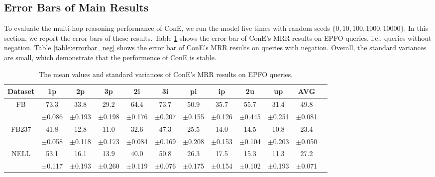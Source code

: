 \documentclass{article}
\newcommand{\std}[1]{\tiny{$\pm$#1}}
\begin{document}
\subsection{Error Bars of Main Results}
To evaluate the multi-hop reasoning performance of ConE, we run the model five times with random seeds $\{0,10,100,1000,10000\}$. In this section, we report the error bars of these results. Table \ref{table:errorbar_epfo} shows the error bar of ConE's MRR results on EPFO queries, i.e., queries without negation. Table \ref{table:errorbar_neg} shows the error bar of ConE's MRR results on queries with negation. Overall, the standard variances are small, which demonstrate that the performence of ConE is stable.

\begin{table}[!ht]
    \centering
    \caption{The mean values and standard variances of ConE's MRR results on EPFO queries.}
    \label{table:errorbar_epfo}
    \vspace{1mm}
    \begin{tabular}{c c c  c c c c  c c c c c}
        \toprule
          \textbf{Dataset} &\textbf{1p} &\textbf{2p} &\textbf{3p} &\textbf{2i} &\textbf{3i} &\textbf{pi} &\textbf{ip} &\textbf{2u} &\textbf{up} &\textbf{AVG} \\
        \midrule
        \multirow{2}{*}{FB} &73.3 &33.8 &29.2 &64.4 &73.7 &50.9 &35.7 &55.7 &31.4 &49.8\\
        &\std{0.086} &\std{0.193} &\std{0.198} &\std{0.176} &\std{0.207} &\std{0.155} &\std{0.126} &\std{0.445} &\std{0.251} &\std{0.081}\\
        \midrule
        \multirow{2}{*}{FB237} &41.8 &12.8 &11.0 &32.6 &47.3 &25.5 &14.0 &14.5 &10.8  &23.4 \\
        &\std{0.058} &\std{0.118} &\std{0.173} &\std{0.084} &\std{0.169} &\std{0.208} &\std{0.153} &\std{0.104} &\std{0.203} &\std{0.050}\\
        \midrule
         \multirow{2}{*}{NELL}   &53.1 &16.1 &13.9 &40.0&50.8 &26.3 &17.5 &15.3 &11.3   &27.2 \\
        &\std{0.117} &\std{0.193} &\std{0.260} &\std{0.119} &\std{0.076} &\std{0.175} &\std{0.154} &\std{0.102} &\std{0.193} &\std{0.071}\\
        \bottomrule
    \end{tabular}

\end{table}
\end{document}
